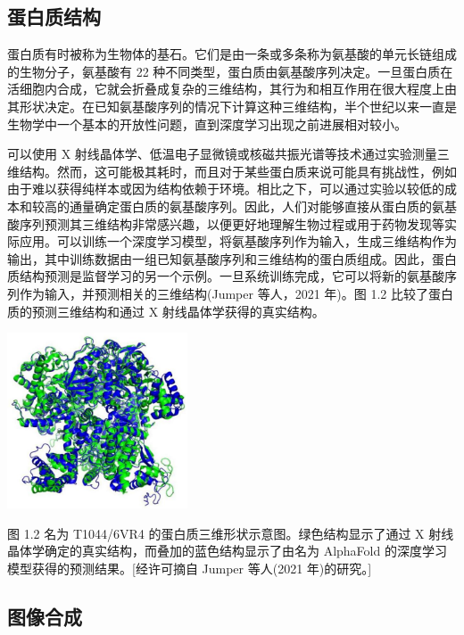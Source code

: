 \documentclass[10pt]{article}
\begin{document}
\subsection{蛋白质结构}

蛋白质有时被称为生物体的基石。它们是由一条或多条称为氨基酸的单元长链组成的生物分子，氨基酸有 22 种不同类型，蛋白质由氨基酸序列决定。一旦蛋白质在活细胞内合成，它就会折叠成复杂的三维结构，其行为和相互作用在很大程度上由其形状决定。在已知氨基酸序列的情况下计算这种三维结构，半个世纪以来一直是生物学中一个基本的开放性问题，直到深度学习出现之前进展相对较小。

可以使用 X 射线晶体学、低温电子显微镜或核磁共振光谱等技术通过实验测量三维结构。然而，这可能极其耗时，而且对于某些蛋白质来说可能具有挑战性，例如由于难以获得纯样本或因为结构依赖于环境。相比之下，可以通过实验以较低的成本和较高的通量确定蛋白质的氨基酸序列。因此，人们对能够直接从蛋白质的氨基酸序列预测其三维结构非常感兴趣，以便更好地理解生物过程或用于药物发现等实际应用。可以训练一个深度学习模型，将氨基酸序列作为输入，生成三维结构作为输出，其中训练数据由一组已知氨基酸序列和三维结构的蛋白质组成。因此，蛋白质结构预测是监督学习的另一个示例。一旦系统训练完成，它可以将新的氨基酸序列作为输入，并预测相关的三维结构(Jumper 等人，2021 年)。图 1.2 比较了蛋白质的预测三维结构和通过 \(\mathrm{X}\) 射线晶体学获得的真实结构。

\begin{center}
\includegraphics[max width=0.4\textwidth]{images/0194e279-9b28-703a-88f4-c3ac21e2010d_23_983_356_566_553_0.jpg}
\end{center}
\hspace*{3em} 

图 1.2 名为 T1044/6VR4 的蛋白质三维形状示意图。绿色结构显示了通过 X 射线晶体学确定的真实结构，而叠加的蓝色结构显示了由名为 AlphaFold 的深度学习模型获得的预测结果。[经许可摘自 Jumper 等人(2021 年)的研究。]

\subsection{图像合成}
\end{document}
